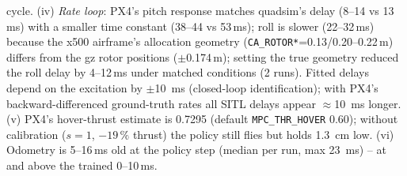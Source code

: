 cycle. (iv) \emph{Rate loop}: PX4's pitch response matches quadsim's delay (8--14 vs 13\,ms) with a smaller time constant
(38--44 vs 53\,ms); roll is slower (22--32\,ms) because the x500 airframe's allocation geometry
(\texttt{CA\_ROTOR*}=0.13/0.20--0.22\,m) differs from the gz rotor positions ($\pm$0.174\,m); setting the true geometry
reduced the roll delay by 4--12\,ms under matched conditions (2 runs). Fitted delays depend on the excitation by
$\pm$\SI{10}{ms} (closed-loop identification); with PX4's backward-differenced ground-truth rates all SITL delays appear
$\approx$\SI{10}{ms} longer. (v) PX4's hover-thrust estimate is 0.7295
(default \texttt{MPC\_THR\_HOVER} 0.60); without calibration ($s=1$, $-19\,\%$ thrust) the policy still flies but holds
\SI{1.3}{cm} low. (vi) Odometry is 5--16\,ms old at the policy step (median per run, max \SI{23}{ms}) -- at and above the
trained 0--10\,ms.

